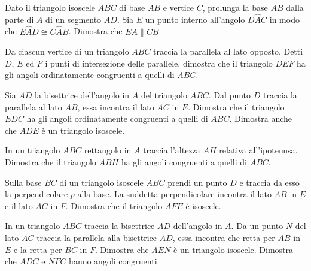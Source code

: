 \begin{multicols}{2}
\begin{esercizio}
\label{ese:3.29}
Dato il triangolo isoscele \(ABC\) di base \(AB\) e vertice \(C\), prolunga 
la base \(AB\) dalla parte di \(A\) di un segmento \(AD\). Sia \(E\) un punto 
interno all'angolo \(D\widehat{A}C\) in modo che \(E\widehat{A}D\cong 
C\widehat{A}B\). Dimostra che \(EA\parallel CB\).
\end{esercizio}

\begin{esercizio}
\label{ese:3.30}
Da ciascun vertice di un triangolo \(ABC\) traccia la parallela al lato 
opposto. Detti \(D\), \(E\) ed \(F\) i punti di intersezione delle 
parallele, dimostra che il triangolo \(DEF\) ha gli angoli 
ordinatamente congruenti a quelli di \(ABC\).
\end{esercizio}

\begin{esercizio}
\label{ese:3.31}
Sia \(AD\) la bisettrice dell'angolo in \(A\) del triangolo \(ABC\). Dal 
punto \(D\) traccia la parallela al lato \(AB\), essa incontra il lato 
\(AC\) in \(E\). Dimostra che il triangolo \(EDC\) ha gli angoli 
ordinatamente congruenti a quelli di \(ABC\). Dimostra anche che \(ADE\) 
è un triangolo isoscele.
\end{esercizio}

\begin{esercizio}
\label{ese:3.32}
In un triangolo \(ABC\) rettangolo in \(A\) traccia l'altezza \(AH\) 
relativa all'ipotenusa. Dimostra che il triangolo \(ABH\) ha gli angoli 
congruenti a quelli di \(ABC\).
\end{esercizio}

\begin{esercizio}
\label{ese:3.33}
Sulla base \(BC\) di un triangolo isoscele \(ABC\) prendi un punto \(D\) e 
traccia da esso la perpendicolare \(p\) alla base. La suddetta 
perpendicolare incontra il lato \(AB\) in \(E\) e il lato \(AC\) in \(F\). 
Dimostra che il triangolo \(AFE\) è isoscele.
\end{esercizio}

\begin{esercizio}
\label{ese:3.34}
In un triangolo \(ABC\) traccia la bisettrice \(AD\) dell'angolo in \(A\). 
Da un punto \(N\) del lato \(AC\) traccia la parallela alla bisettrice 
\(AD\), essa incontra che retta per \(AB\) in \(E\) e la retta per \(BC\) in 
\(F\). Dimostra che \(AEN\) è un triangolo isoscele. Dimostra che \(ADC\) e 
\(NFC\) hanno angoli congruenti.
\end{esercizio}


\end{multicols}
